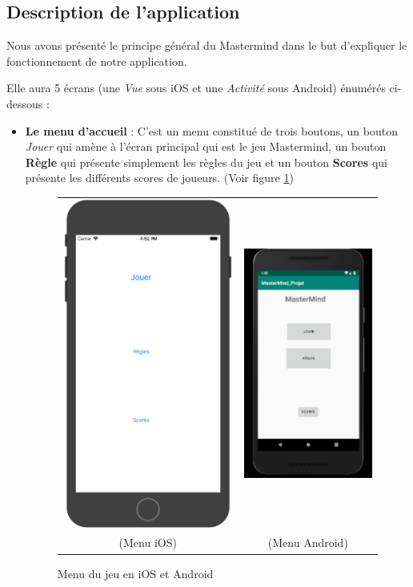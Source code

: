 \documentclass{article}
\begin{document}
\subsection{Description de l'application} 
\label{subsection:Description de l'application}

Nous avons présenté le principe général du Mastermind dans le but d'expliquer le fonctionnement de notre application. 

Elle aura 5 écrans (une \textit{Vue} sous iOS et une \textit{Activité} sous Android) énumérés ci-dessous : 
\vspace{1\baselineskip}

\begin{itemize}

\item \textbf{Le menu d’accueil} : C'est un menu constitué de trois boutons, un bouton \textit{Jouer} qui amène à l'écran principal qui est le jeu Mastermind, un bouton \textbf{Règle} qui présente simplement les règles du jeu et un bouton \textbf{Scores} qui présente les différents scores de joueurs. (Voir figure \ref{fig:Menu})

\begin{figure}[tb]
    \centering
    \begin{tabular}{cc}
      \includegraphics[width=.3\linewidth]{./img/mastermind_menu_ios.png} &
      \includegraphics[width=.3\linewidth]{./img/mastermind_menu_android.png} \\
      (Menu iOS) & (Menu Android)\\
    \end{tabular}
    \caption{Menu du jeu en iOS et Android \label{fig:Menu}}
\end{figure}
\vspace{1\baselineskip}


\end{itemize}
\end{document}
